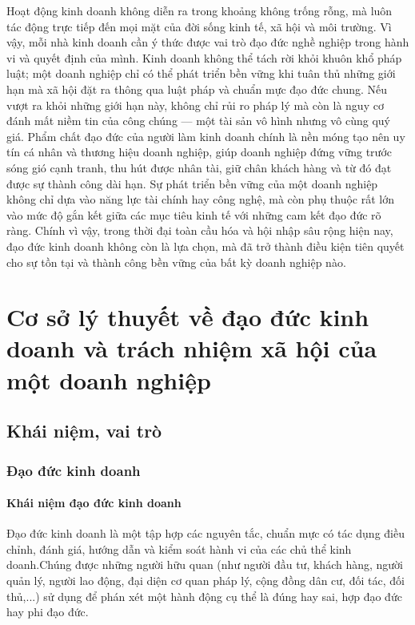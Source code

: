 \documentclass{article}
\begin{document}
\vspace{0.5cm}
Hoạt động kinh doanh không diễn ra trong khoảng không trống rỗng, mà luôn tác động trực tiếp đến mọi mặt của đời sống kinh tế, xã hội và môi trường. Vì vậy, mỗi nhà kinh doanh cần ý thức được vai trò đạo đức nghề nghiệp trong hành vi và quyết định của mình. Kinh doanh không thể tách rời khỏi khuôn khổ pháp luật; một doanh nghiệp chỉ có thể phát triển bền vững khi tuân thủ những giới hạn mà xã hội đặt ra thông qua luật pháp và chuẩn mực đạo đức chung. Nếu vượt ra khỏi những giới hạn này, không chỉ rủi ro pháp lý mà còn là nguy cơ đánh mất niềm tin của công chúng — một tài sản vô hình nhưng vô cùng quý giá. Phẩm chất đạo đức của người làm kinh doanh chính là nền móng tạo nên uy tín cá nhân và thương hiệu doanh nghiệp, giúp doanh nghiệp đứng vững trước sóng gió cạnh tranh, thu hút được nhân tài, giữ chân khách hàng và từ đó đạt được sự thành công dài hạn. Sự phát triển bền vững của một doanh nghiệp không chỉ dựa vào năng lực tài chính hay công nghệ, mà còn phụ thuộc rất lớn vào mức độ gắn kết giữa các mục tiêu kinh tế với những cam kết đạo đức rõ ràng. Chính vì vậy, trong thời đại toàn cầu hóa và hội nhập sâu rộng hiện nay, đạo đức kinh doanh không còn là lựa chọn, mà đã trở thành điều kiện tiên quyết cho sự tồn tại và thành công bền vững của bất kỳ doanh nghiệp nào.
\vspace{1cm}

\newpage
\section{Cơ sở lý thuyết về đạo đức kinh doanh và trách nhiệm xã hội của một doanh nghiệp}
\subsection{Khái niệm, vai trò}
    \subsubsection{Đạo đức kinh doanh}
        \paragraph{Khái niệm đạo đức kinh doanh}
            \vspace{0.2cm}
            Đạo đức kinh doanh là một tập hợp các nguyên tắc, chuẩn mực có tác dụng điều chỉnh, đánh giá, hướng dẫn và kiểm soát hành vi của các chủ thể kinh doanh.Chúng được những người hữu quan (như người đầu tư, khách hàng, người quản lý, người lao động, đại diện cơ quan pháp lý, cộng đồng dân cư, đối tác, đối thủ,...) sử dụng để phán xét một hành động cụ thể là đúng hay sai, hợp đạo đức hay phi đạo đức.
            
\end{document}
